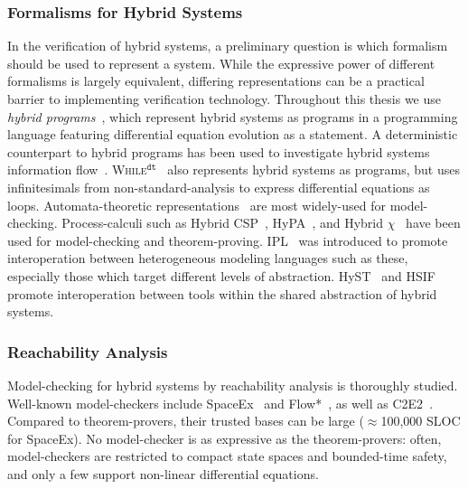 \documentclass[12pt]{cmuthesis}
\theoremstyle{definition}
\theoremstyle{remark}
\begin{document}
\subsubsection{Formalisms for Hybrid Systems}
In the verification of hybrid systems, a preliminary question is which formalism should be used to represent a system.
While the expressive power of different formalisms is largely equivalent, differing representations can be a practical barrier to implementing verification technology.
Throughout this thesis we use \emph{hybrid programs}~\cite{DBLP:books/sp/Platzer18}, which represent hybrid systems as programs in a programming language featuring differential equation evolution as a statement.
A deterministic counterpart to hybrid programs has been used to investigate hybrid systems information flow~\cite{DBLP:conf/hicons/PrabhakarK13}.
\textsc{While}$^{\texttt{dt}}$~\cite{DBLP:conf/icalp/SuenagaH11} also represents hybrid systems as programs, but uses infinitesimals from non-standard-analysis to express differential equations as loops.
Automata-theoretic representations~\cite{DBLP:conf/lics/Henzinger96} are most widely-used for model-checking.
Process-calculi such as Hybrid CSP~\cite{DBLP:conf/hybrid/ChaochenJR95,DBLP:conf/aplas/LiuLQZZZZ10}, HyPA~\cite{DBLP:journals/jlp/CuijpersR05}, and Hybrid $\chi$~\cite{DBLP:conf/formats/SchiffelersBMRR03} have been used for model-checking and theorem-proving.
IPL~\cite{DBLP:conf/fm/RuchkinSISG18} was introduced to promote interoperation between heterogeneous modeling languages such as these, especially those which target different levels of abstraction.
HyST~\cite{DBLP:conf/hybrid/BakBJ15} and HSIF~\cite{DBLP:conf/hybrid/PintoCPS06} promote interoperation between tools within the shared abstraction of hybrid systems.

\subsubsection{Reachability Analysis}
Model-checking for hybrid systems by reachability analysis is thoroughly studied.
Well-known model-checkers include SpaceEx~\cite{DBLP:conf/cav/FrehseGDCRLRGDM11} and Flow*~\cite{DBLP:conf/cav/ChenAS13}, as well as C2E2~\cite{DBLP:conf/tacas/DuggiralaMVP15}.
Compared to theorem-provers, their trusted bases can be large (${\approx}$100,000 SLOC for SpaceEx).
No model-checker is as expressive as the theorem-provers: often, model-checkers are restricted to compact state spaces and bounded-time safety, and only a few support non-linear differential equations.
\end{document}
